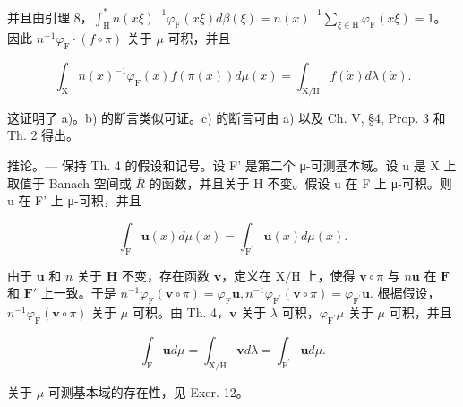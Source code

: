 并且由引理 8，\(\int_{\mathrm{H}}^{*}n(x\xi)^{-1}\varphi_{\mathrm{F}}(x\xi)d\beta (\xi) = n(x)^{-1}\sum_{\xi \in \mathrm{H}}\varphi_{\mathrm{F}}(x\xi) = 1\)。因此 \(n^{-1}\varphi_{\mathrm{F}}\cdot (f\circ \pi)\) 关于 \(\mu\) 可积，并且

\[
\int_ {\mathrm{X}} n (x) ^ {- 1} \varphi_ {\mathrm{F}} (x) f (\pi (x)) d \mu (x) = \int_ {\mathrm{X/H}} f (\dot {x}) d \lambda (\dot {x}).
\]

这证明了 a)。b) 的断言类似可证。c) 的断言可由 a) 以及 Ch. V, §4, Prop. 3 和 Th. 2 得出。

推论。--- 保持 Th. 4 的假设和记号。设 F' 是第二个 μ-可测基本域。设 u 是 X 上取值于 Banach 空间或 \(\overline{R}\) 的函数，并且关于 H 不变。假设 u 在 F 上 μ-可积。则 u 在 F' 上 μ-可积，并且

\[
\int_ {\mathrm{F}} \mathbf {u} (x) d \mu (x) = \int_ {\mathrm{F} ^ {\prime}} \mathbf {u} (x) d \mu (x).
\]

由于 \(\mathbf{u}\) 和 \(n\) 关于 \(\mathbf{H}\) 不变，存在函数 \(\mathbf{v}\)，定义在 \(\mathrm{X / H}\) 上，使得 \(\mathbf{v} \circ \pi\) 与 \(n\mathbf{u}\) 在 \(\mathbf{F}\) 和 \(\mathbf{F}'\) 上一致。于是 \(n^{-1}\varphi_{\mathrm{F}}(\mathbf{v}\circ \pi) = \varphi_{\mathrm{F}}\mathbf{u}, n^{-1}\varphi_{\mathrm{F}^{\prime}}(\mathbf{v}\circ \pi) = \varphi_{\mathrm{F}^{\prime}}\mathbf{u}.\) 根据假设，\(n^{-1}\varphi_{\mathrm{F}}(\mathbf{v}\circ \pi)\) 关于 \(\mu\) 可积。由 Th. 4，\(\mathbf{v}\) 关于 \(\lambda\) 可积，\(\varphi_{\mathrm{F}^{\prime}}\mu\) 关于 \(\mu\) 可积，并且

\[
\int_ {\mathrm{F}} \mathbf {u} d \mu = \int_ {\mathrm{X/H}} \mathbf {v} d \lambda = \int_ {\mathrm{F} ^ {\prime}} \mathbf {u} d \mu .
\]

关于 \(\mu\)-可测基本域的存在性，见 Exer. 12。

